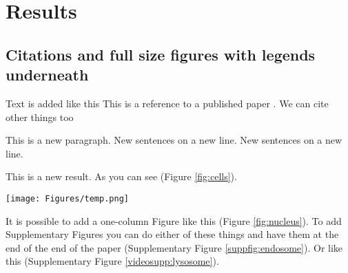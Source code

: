%






\section*{Results}\label{s:results}

\subsection*{Citations and full size figures with legends underneath}

Text is added like this
This is a reference to a published paper \citep{watson_molecular_1953}.
We can cite other things too \citep{tipton_complexities_2019,zheng_genome_2011,alberts_molecular_2002}

This is a new paragraph.
New sentences on a new line.
New sentences on a new line.

This is a new result.
As you can see (Figure \ref{fig:cells}).

\begin{figure*}
\centering
\texttt{[image: Figures/temp.png]}
\caption{\textbf{These are cells.}\\
(\textbf{A}) This is a regular figure with a legend as a caption underneath. Inset: 3X zoom. Scale bar, \SI{10}{\micro\meter}.}
\label{fig:cells}
\end{figure*}

It is possible to add a one-column Figure like this (Figure \ref{fig:nucleus}).
To add Supplementary Figures you can do either of these things and have them at the end of the end of the paper (Supplementary Figure \ref{suppfig:endosome}).
Or like this (Supplementary Figure \ref{videosupp:lysosome}).

